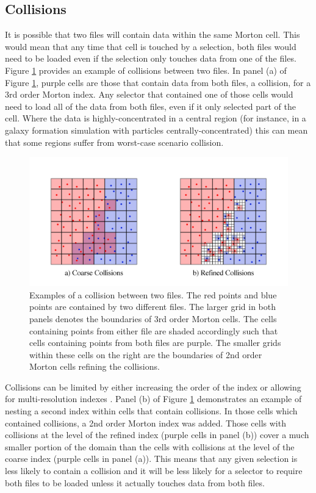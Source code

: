 \documentclass[apjl]{emulateapj}
\begin{document}
\subsection{Collisions}
It is possible that two files will contain data within the same Morton cell.  This would mean that any time that cell is touched by a selection, both files would need to be loaded even if the selection only touches data from one of the files. Figure \ref{fig:collision} provides an example of collisions between two files. In panel (a) of Figure \ref{fig:collision}, purple cells are those that contain data from both files, a collision, for a 3rd order Morton index. Any selector that contained one of those cells would need to load all of the data from both files, even if it only selected part of the cell.  Where the data is highly-concentrated in a central region (for instance, in a galaxy formation simulation with particles centrally-concentrated) this can mean that some regions suffer from worst-case scenario collision.
%
\begin{figure}[htbp]
\begin{center}
\includegraphics[width=\columnwidth,keepaspectratio]{../images/collisions.png}
\caption{Examples of a collision between two files. The red points and blue points are contained by two different files. The larger grid in both panels denotes the boundaries of 3rd order Morton cells.  The cells containing points from either file are shaded accordingly such that cells containing points from both files are purple. The smaller grids within these cells on the right are the boundaries of 2nd order Morton cells refining the collisions.}
\label{fig:collision}
\end{center}
\end{figure}
%

Collisions can be limited by either increasing the order of the index or allowing for multi-resolution indexes \citep{Sinha2006,Sinha2007}. Panel (b) of Figure \ref{fig:collision} demonstrates an example of nesting a second index within cells that contain collisions. In those cells which contained collisions, a 2nd order Morton index was added. Those cells with collisions at the level of the refined index (purple cells in panel (b)) cover a much smaller portion of the domain than the cells with collisions at the level of the coarse index (purple cells in panel (a)). This means that any given selection is less likely to contain a collision and it will be less likely for a selector to require both files to be loaded unless it actually touches data from both files.
\end{document}
